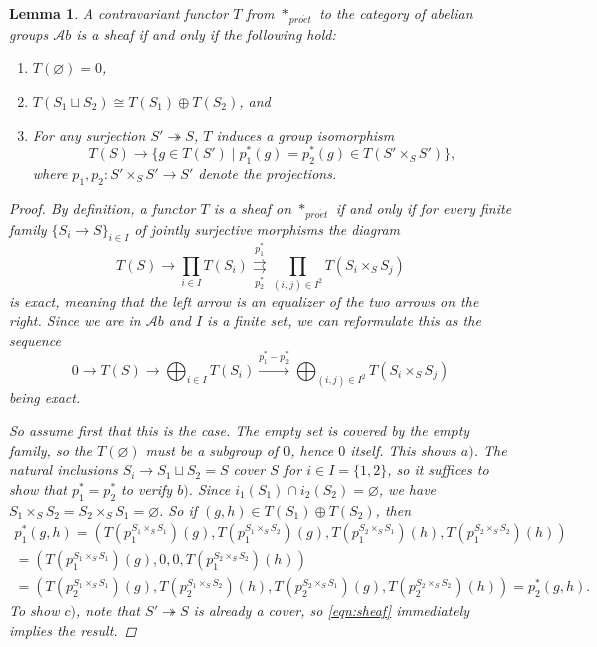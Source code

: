 \documentclass[11pt,A4]{article}
\theoremstyle{plain}
\newtheorem{lm}[thm]{Lemma}
\theoremstyle{definition}
\theoremstyle{remark}
\newcommand{\Ab}{\mathscr{A}b}
\newcommand{\pe}{*_{pro\acute et}}
\newcommand{\op}{\oplus}
\begin{document}
\begin{lm}\label{lm:sheaves}
    A contravariant functor $T$ from $\pe$ to the category of abelian groups $\Ab$ is a sheaf if and only if the following hold:
    \begin{enumerate}[label=\alph*)]
	\item $T(\varnothing)=0$,
	\item $T(S_{1}\sqcup S_{2})\cong T(S_{1})\op T(S_{2})$, and
	\item For any surjection $S'\twoheadrightarrow S$, $T$ induces a group isomorphism
	    \[ T(S)\to \{ g\in T(S') \mid p_{1}^{*}(g)=p_{2}^{*}(g) \in T(S'\times_{S}S') \}, \]
	    where $p_{1},p_{2}\colon S'\times_{S}S'\to S'$ denote the projections.
    \end{enumerate}
    \begin{proof}
	By definition, a functor $T$ is a sheaf on $\pe$ if and only if for every finite family $\{ S_{i}\to S\}_{i\in I}$ of jointly surjective morphisms the diagram
	\[ T(S)\to \prod_{i\in I} T(S_{i})\overset{p_{1}^{*}}{\underset{p_{2}^{*}}{\rightrightarrows}}\prod_{(i,j)\in I^{2}} T(S_{i}\times_{S} S_{j}) \]
	is exact, meaning that the left arrow is an equalizer of the two arrows on the right.
	Since we are in $\Ab$ and $I$ is a finite set, we can reformulate this as the sequence
	\begin{equation}\label{eqn:sheaf}
	    0\to T(S)\to \bigoplus_{i\in I} T(S_{i})\xrightarrow{p_{1}^{*}-p_{2}^{*}} \bigoplus_{(i,j)\in I^{2}} T(S_{i}\times_{S}S_{j})
	\end{equation}
	being exact.

	So assume first that this is the case.
	The empty set is covered by the empty family, so the $T(\varnothing)$ must be a subgroup of $0$, hence $0$ itself.
	This shows $a)$.
	The natural inclusions $S_{i}\to S_{1}\sqcup S_{2}=S$ cover $S$ for $i\in I=\{1,2\}$, so it suffices to show that $p_{1}^{*}=p_{2}^{*}$ to verify $b)$.
	Since $i_{1}(S_{1})\cap i_{2}(S_{2})=\varnothing $, we have $S_{1}\times_{S}S_{2}=S_{2}\times_{S}S_{1}=\varnothing $.
	So if $(g,h)\in T(S_{1})\op T(S_{2})$, then
	\begin{multline*}
	    p_{1}^{*}(g,h)=(T(p_{1}^{S_{1}\times_{S}S_{1}})(g),T(p_{1}^{S_{1}\times_{S}S_{2}})(g),T(p_{1}^{S_{2}\times_{S}S_{1}})(h),T(p_{1}^{S_{2}\times_{S}S_{2}})(h)) \\ 
	    =(T(p_{1}^{S_{1}\times_{S}S_{1}})(g),0,0,T(p_{1}^{S_{2}\times_{S}S_{2}})(h)) \\
	    =(T(p_{2}^{S_{1}\times_{S}S_{1}})(g),T(p_{2}^{S_{1}\times_{S}S_{2}})(h),T(p_{2}^{S_{2}\times_{S}S_{1}})(g),T(p_{2}^{S_{2}\times_{S}S_{2}})(h))=p_{2}^{*}(g,h).
	\end{multline*}
	To show $c)$, note that $S'\twoheadrightarrow S$ is already a cover, so \cref{eqn:sheaf} immediately implies the result.


\end{proof}
\end{lm}
\end{document}
